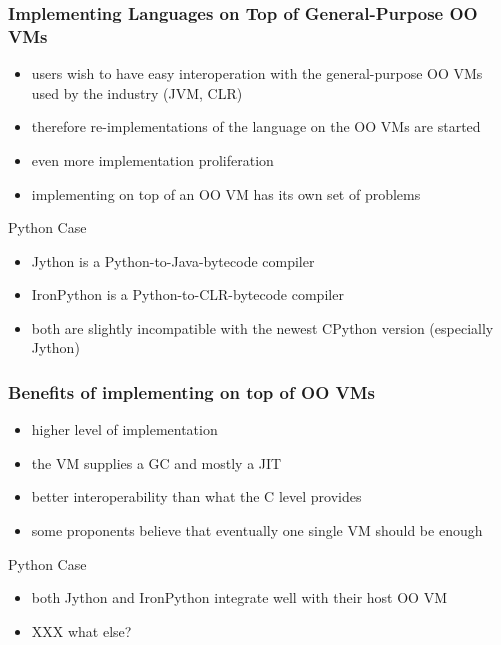 \documentclass[utf8x]{beamer}
\begin{document}
\begin{frame}
  \frametitle{Implementing Languages on Top of General-Purpose OO VMs}
  \begin{itemize}
  \item
    users wish to have easy interoperation with the general-purpose OO VMs used
    by the industry (JVM, CLR)
  \item
    therefore re-implementations of the language on the OO VMs are started
  \item
    even more implementation proliferation
  \item
    implementing on top of an OO VM has its own set of problems
  \end{itemize}
  \pause
  \begin{block}{
    Python Case}
    \begin{itemize}
    \item
      \alert{Jython} is a Python-to-Java-bytecode compiler
    \item
      \alert{IronPython} is a Python-to-CLR-bytecode compiler
    \item
      both are slightly incompatible with the newest CPython version (especially
      Jython)
    \end{itemize}
  \end{block}
\end{frame}

\begin{frame}
  \frametitle{Benefits of implementing on top of OO VMs}
  \begin{itemize}
  \item
    higher level of implementation
  \item
    the VM supplies a GC and mostly a JIT
  \item
    better interoperability than what the C level provides
  \item
    some proponents believe that eventually one single VM should be enough
  \end{itemize}
  \pause
  \begin{block}{
    Python Case}
    \begin{itemize}
    \item
      both Jython and IronPython integrate well with their host OO VM
    \item
      XXX what else?
    \end{itemize}
  \end{block}
\end{frame}
\end{document}
